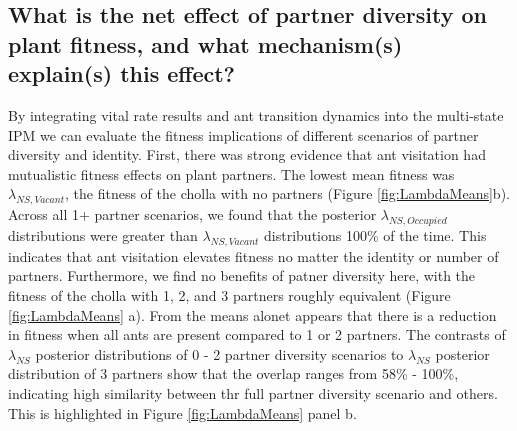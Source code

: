 \documentclass[11pt]{article}
\begin{document}
\subsection*{What is the net effect of partner diversity on plant fitness, and what mechanism(s) explain(s) this effect?}
By integrating vital rate results and ant transition dynamics into the multi-state IPM we can evaluate the fitness implications of different scenarios of partner diversity and identity. 
First, there was strong evidence that ant visitation had mutualistic fitness effects on plant partners. 
The lowest mean fitness was $\lambda_{NS,Vacant}$, the fitness of the cholla with no partners (Figure \ref{fig:LambdaMeans}b).
Across all 1+ partner scenarios, we found that the posterior $\lambda_{NS,Occupied}$ distributions were greater than $\lambda_{NS,Vacant}$ distributions 100\% of the time.
This indicates that ant visitation elevates fitness no matter the identity or number of partners.
Furthermore, we find no benefits of patner diversity here, with the fitness of the cholla with 1, 2, and 3 partners roughly equivalent (Figure \ref{fig:LambdaMeans} a).
From the means alonet appears that there is a reduction in fitness when all ants are present compared to 1 or 2 partners.
The contrasts of $\lambda_{NS}$ posterior distributions of 0 - 2 partner diversity scenarios to $\lambda_{NS}$ posterior distribution of 3 partners show that the overlap ranges from 58\% - 100\%, indicating high similarity between thr full partner diversity scenario and others.
This is highlighted in Figure \ref{fig:LambdaMeans} panel b.
\end{document}
